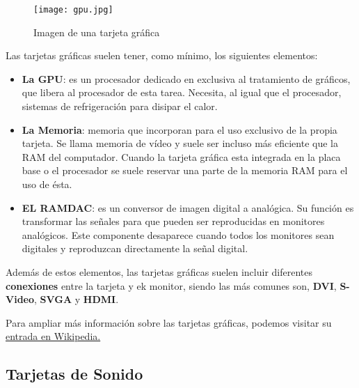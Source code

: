 \begin{figure}[ht]
    \centering
    \texttt{[image: gpu.jpg]}
    \caption{Imagen de una tarjeta gráfica}
\end{figure}

\newpage

Las tarjetas gráficas suelen tener, como mínimo, los siguientes elementos:

\begin{itemize}
    \item \textbf{La GPU}: es un procesador dedicado en exclusiva al tratamiento de gráficos, que libera al procesador de esta tarea. Necesita, al igual que el procesador, sistemas de refrigeración para disipar el calor.

    \item \textbf{La Memoria}: memoria que incorporan para el uso exclusivo de la propia tarjeta. Se llama memoria de vídeo y suele ser incluso más eficiente que la RAM del computador. Cuando la tarjeta gráfica esta integrada en la placa base o el procesador se suele reservar una parte de la memoria RAM para el uso de ésta.

    \item \textbf{EL RAMDAC}: es un conversor de imagen digital a analógica. Su función es transformar las señales para que pueden ser reproducidas en monitores analógicos. Este componente desaparece cuando todos los monitores sean digitales y reproduzcan directamente la señal digital.
\end{itemize}

Además de estos elementos, las tarjetas gráficas suelen incluir diferentes \textbf{conexiones} entre la tarjeta y ek monitor, siendo las más comunes son, \textbf{\gls{DVI}}, \textbf{\gls{S-Video}}, \textbf{\gls{SVGA}} y \textbf{\gls{HDMI}}.

Para ampliar más información sobre las tarjetas gráficas, podemos visitar su \href{https://es.wikipedia.org/wiki/Tarjeta_gr\%C3\%A1fica}{entrada en Wikipedia.}

\subsection{Tarjetas de Sonido}






\glsaddall
\printglossaries


\newpage
{}




